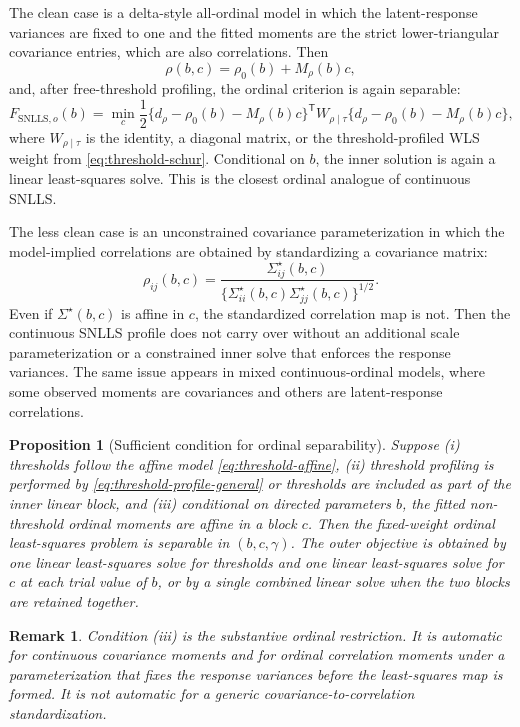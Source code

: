\documentclass[11pt]{article}
\newtheorem{proposition}{Proposition}
\newtheorem{remark}{Remark}
\newcommand{\trans}{^{\mathsf T}}
\newcommand{\SNLLS}{\mathrm{SNLLS}}
\begin{document}
The clean case is a delta-style all-ordinal model in which the
latent-response variances are fixed to one and the fitted moments are the
strict lower-triangular covariance entries, which are also correlations. Then
\[
  \rho(b,c)=\rho_0(b)+M_\rho(b)c,
\]
and, after free-threshold profiling, the ordinal criterion is again separable:
\begin{equation}
  F_{\SNLLS,o}(b)
  =
  \min_c
  \frac{1}{2}
  \{d_\rho-\rho_0(b)-M_\rho(b)c\}\trans
  W_{\rho\mid\tau}
  \{d_\rho-\rho_0(b)-M_\rho(b)c\},
  \label{eq:ordinal-snlls-clean}
\end{equation}
where \(W_{\rho\mid\tau}\) is the identity, a diagonal matrix, or the
threshold-profiled WLS weight from \eqref{eq:threshold-schur}. Conditional on
\(b\), the inner solution is again a linear least-squares solve. This is the
closest ordinal analogue of continuous SNLLS.

The less clean case is an unconstrained covariance parameterization in which
the model-implied correlations are obtained by standardizing a covariance
matrix:
\[
  \rho_{ij}(b,c)
  =
  \frac{\Sigma^\star_{ij}(b,c)}
       {\{\Sigma^\star_{ii}(b,c)\Sigma^\star_{jj}(b,c)\}^{1/2}}.
\]
Even if \(\Sigma^\star(b,c)\) is affine in \(c\), the standardized correlation
map is not. Then the continuous SNLLS profile does not carry over without an
additional scale parameterization or a constrained inner solve that enforces
the response variances. The same issue appears in mixed continuous-ordinal
models, where some observed moments are covariances and others are
latent-response correlations.

\begin{proposition}[Sufficient condition for ordinal separability]
\label{prop:ordinal-separable}
Suppose (i) thresholds follow the affine model \eqref{eq:threshold-affine},
(ii) threshold profiling is performed by \eqref{eq:threshold-profile-general}
or thresholds are included as part of the inner linear block, and
(iii) conditional on directed parameters \(b\), the fitted non-threshold
ordinal moments are affine in a block \(c\). Then the fixed-weight ordinal
least-squares problem is separable in \((b,c,\gamma)\). The outer objective is
obtained by one linear least-squares solve for thresholds and one linear
least-squares solve for \(c\) at each trial value of \(b\), or by a single
combined linear solve when the two blocks are retained together.
\end{proposition}

\begin{remark}
Condition (iii) is the substantive ordinal restriction. It is automatic for
continuous covariance moments and for ordinal correlation moments under a
parameterization that fixes the response variances before the least-squares
map is formed. It is not automatic for a generic covariance-to-correlation
standardization.
\end{remark}
\end{document}
